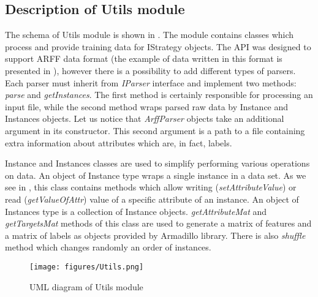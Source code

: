 \subsection{Description of Utils module}

The schema of Utils module is shown in . The module contains classes which process and provide training data for IStrategy objects. The API was designed to support ARFF data format (the example of data written in this format is presented in ), however there is a possibility to add different types of parsers. Each parser must inherit from \textit{IParser} interface and implement two methods: \textit{parse} and \textit{getInstances}. The first method is certainly responsible for processing an input file, while the second method wraps parsed raw data by Instance and Instances objects. Let us notice that \textit{ArffParser} objects take an additional argument in its constructor. This second argument is a path to a file containing extra information about attributes which are, in fact, labels.

Instance and Instances classes are used to simplify performing various operations on data. An object of Instance type wraps a single instance in a data set. As we see in , this class contains methods which allow writing (\textit{setAttributeValue}) or read (\textit{getValueOfAttr}) value of a specific attribute of an instance. An object of Instances type is a collection of Instance objects. \textit{getAttributeMat} and \textit{getTargetsMat} methods of this class are used to generate a matrix of features and a matrix of labels as objects provided by Armadillo library. There is also \textit{shuffle} method which changes randomly an order of instances.  

\begin{figure}
\centering
\caption{UML diagram of Utils module}
\label{fig:utils_sh}
\texttt{[image: figures/Utils.png]}
\end{figure}

